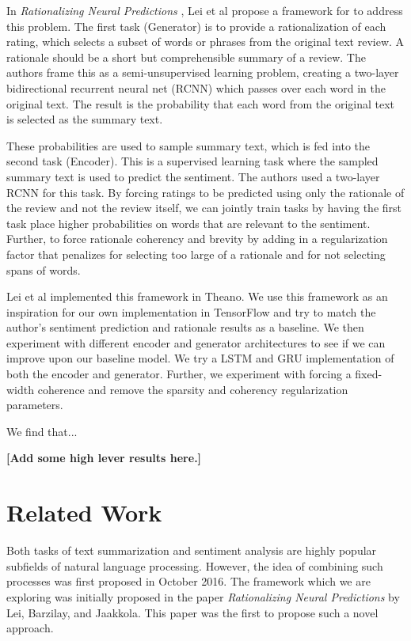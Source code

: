 \documentclass{article} %
\begin{document}
In \textit{Rationalizing Neural Predictions} \cite{Lei}, Lei et al propose a
framework for to address this problem. The first task (Generator) is to provide
a rationalization of each rating, which selects a subset of words or phrases
from the original text review. A rationale should be a short but comprehensible
summary of a review. The authors frame this as a semi-unsupervised learning
problem, creating a two-layer bidirectional recurrent neural net (RCNN) which
passes over each word in the original text. The result is the probability that
each word from the original text is selected as the summary text.

These probabilities are used to sample summary text, which is fed into the
second task (Encoder). This is a supervised learning task where the sampled
summary text is used to predict the sentiment. The authors used a two-layer RCNN
for this task. By forcing ratings to be predicted using only the rationale of
the review and not the review itself, we can jointly train tasks by having the
first task place higher probabilities on words that are relevant to the
sentiment. Further, to force rationale coherency and brevity by adding in a
regularization factor that penalizes for selecting too large of a rationale and
for not selecting spans of words.

Lei et al implemented this framework in Theano. We use this framework as an
inspiration for our own implementation in TensorFlow and try to match the
author's sentiment prediction and rationale results as a baseline. We then
experiment with different encoder and generator architectures to see if we can
improve upon our baseline model. We try a LSTM and GRU implementation of both
the encoder and generator. Further, we experiment with forcing a fixed-width
coherence and remove the sparsity and coherency regularization parameters.

We find that...

\textbf{[Add some high lever results here.]}

\section{Related Work}

Both tasks of text summarization and sentiment analysis are highly popular
subfields of natural language processing. However, the idea of combining such
processes was first proposed in October 2016. The framework which we are
exploring was initially proposed in the paper \textit{Rationalizing Neural
Predictions} by Lei, Barzilay, and Jaakkola. This paper was the first to propose
such a novel approach.
\end{document}
